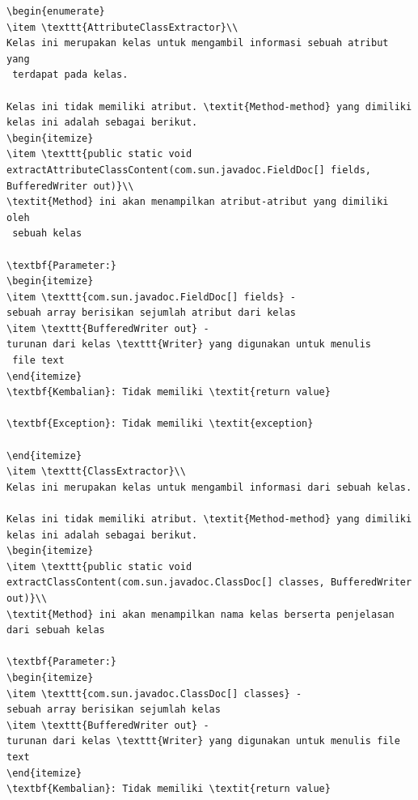 \documentclass[a4paper,twoside]{article}
\begin{document}
\begin{enumerate}
\begin{lstlisting}[caption=Hasil Pengujian Kedua]
\begin{enumerate}
\item \texttt{AttributeClassExtractor}\\ 
Kelas ini merupakan kelas untuk mengambil informasi sebuah atribut yang
 terdapat pada kelas.

Kelas ini tidak memiliki atribut. \textit{Method-method} yang dimiliki kelas ini adalah sebagai berikut.
\begin{itemize}
\item \texttt{public static void extractAttributeClassContent(com.sun.javadoc.FieldDoc[] fields, BufferedWriter out)}\\ 
\textit{Method} ini akan menampilkan atribut-atribut yang dimiliki oleh
 sebuah kelas

\textbf{Parameter:}
\begin{itemize}
\item \texttt{com.sun.javadoc.FieldDoc[] fields} - 
sebuah array berisikan sejumlah atribut dari kelas
\item \texttt{BufferedWriter out} - 
turunan dari kelas \texttt{Writer} yang digunakan untuk menulis
 file text
\end{itemize}
\textbf{Kembalian}: Tidak memiliki \textit{return value}

\textbf{Exception}: Tidak memiliki \textit{exception}

\end{itemize}
\item \texttt{ClassExtractor}\\ 
Kelas ini merupakan kelas untuk mengambil informasi dari sebuah kelas.

Kelas ini tidak memiliki atribut. \textit{Method-method} yang dimiliki kelas ini adalah sebagai berikut.
\begin{itemize}
\item \texttt{public static void extractClassContent(com.sun.javadoc.ClassDoc[] classes, BufferedWriter out)}\\ 
\textit{Method} ini akan menampilkan nama kelas berserta penjelasan dari sebuah kelas

\textbf{Parameter:}
\begin{itemize}
\item \texttt{com.sun.javadoc.ClassDoc[] classes} - 
sebuah array berisikan sejumlah kelas
\item \texttt{BufferedWriter out} - 
turunan dari kelas \texttt{Writer} yang digunakan untuk menulis file text
\end{itemize}
\textbf{Kembalian}: Tidak memiliki \textit{return value}


\end{lstlisting}
\end{enumerate}
\end{document}
